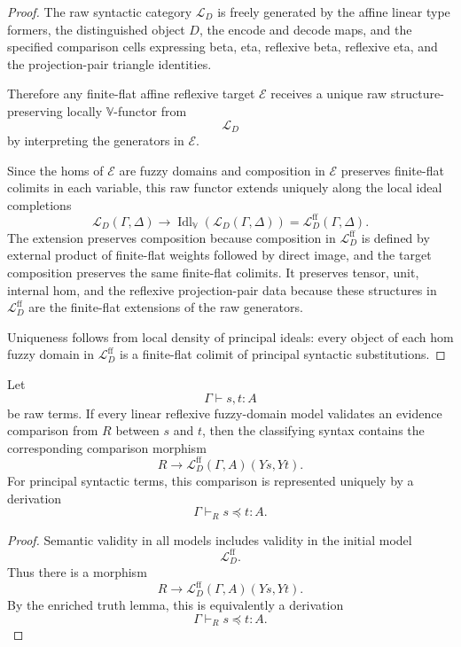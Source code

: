\begin{proof}
The raw syntactic category \(\mathcal L_D\) is freely generated by the affine
linear type formers, the distinguished object \(D\), the encode and decode
maps, and the specified comparison cells expressing beta, eta, reflexive beta,
reflexive eta, and the projection-pair triangle identities.

Therefore any finite-flat affine reflexive target \(\mathcal E\) receives a
unique raw structure-preserving locally \(\mathbb V\)-functor from
\[
    \mathcal L_D
\]
by interpreting the generators in \(\mathcal E\).

Since the homs of \(\mathcal E\) are fuzzy domains and composition in
\(\mathcal E\) preserves finite-flat colimits in each variable, this raw
functor extends uniquely along the local ideal completions
\[
    \mathcal L_D(\Gamma,\Delta)
    \to
    \operatorname{Idl}_{\mathbb V}(\mathcal L_D(\Gamma,\Delta))
    =
    \mathcal L_D^{\mathrm{ff}}(\Gamma,\Delta).
\]
The extension preserves composition because composition in
\(\mathcal L_D^{\mathrm{ff}}\) is defined by external product of finite-flat
weights followed by direct image, and the target composition preserves the same
finite-flat colimits.  It preserves tensor, unit, internal hom, and the
reflexive projection-pair data because these structures in
\(\mathcal L_D^{\mathrm{ff}}\) are the finite-flat extensions of the raw
generators.

Uniqueness follows from local density of principal ideals: every object of
each hom fuzzy domain in \(\mathcal L_D^{\mathrm{ff}}\) is a finite-flat
colimit of principal syntactic substitutions.
\end{proof}

\begin{corollary}
\label{cor:cosmos-level-completeness}
Let
\[
    \Gamma\vdash s,t:A
\]
be raw terms.  If every linear reflexive fuzzy-domain model validates an
evidence comparison from \(R\) between \(s\) and \(t\), then the classifying
syntax contains the corresponding comparison morphism
\[
    R
    \longrightarrow
    \mathcal L_D^{\mathrm{ff}}(\Gamma,A)(Ys,Yt).
\]
For principal syntactic terms, this comparison is represented uniquely by a
derivation
\[
    \Gamma\vdash_R s\preceq t:A.
\]
\end{corollary}

\begin{proof}
Semantic validity in all models includes validity in the initial model
\[
    \mathcal L_D^{\mathrm{ff}}.
\]
Thus there is a morphism
\[
    R
    \to
    \mathcal L_D^{\mathrm{ff}}(\Gamma,A)(Ys,Yt).
\]
By the enriched truth lemma, this is equivalently a derivation
\[
    \Gamma\vdash_R s\preceq t:A.
\]
\end{proof}

